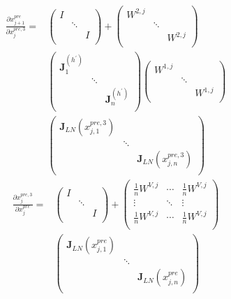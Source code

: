 \documentclass{article}
\begin{document}
\begin{align}
\frac{\partial x_{j+1}^{pre}}{\partial x_j^{pre,3}}=&\left(
  \begin{array}{ccc}
    I &  &  \\
     & \ddots &  \\
     &  &  I\\
  \end{array}
\right)+
\left(
  \begin{array}{ccc}
    W^{2,j} &  &  \\
     & \ddots &  \\
     &  & W^{2,j} \\
  \end{array}
\right)\nonumber\\
&
\left(
  \begin{array}{ccc}
    \mathbf{J}^{\left(h^{\prime}\right)}_1 &  &  \\
     & \ddots &  \\
     &  & \mathbf{J}^{\left(h^{\prime}\right)}_n \\
  \end{array}
\right)
\left(
  \begin{array}{ccc}
    W^{1,j} &  &  \\
     & \ddots &  \\
     &  & W^{1,j} \\
  \end{array}
\right)\nonumber\\
&
\left(
  \begin{array}{ccc}
    \mathbf{J}_{LN}(x^{pre,3}_{j,1}) &  &  \\
     & \ddots &  \\
     &  & \mathbf{J}_{LN}(x^{pre,3}_{j,n}) \\
  \end{array}
\right)
\end{align}
\begin{align}
\frac{\partial x_{j}^{pre,3}}{\partial x_j^{pre}}=&\left(
  \begin{array}{ccc}
    I &  &  \\
     & \ddots &  \\
     &  &  I\\
  \end{array}
\right)+
\left(
  \begin{array}{ccc}
    \frac{1}{n}W^{V,j} & \cdots & \frac{1}{n}W^{V,j} \\
    \vdots & \ddots & \vdots \\
    \frac{1}{n}W^{V,j} & \cdots & \frac{1}{n}W^{V,j} \\
  \end{array}
\right)\nonumber\\
&
\left(
  \begin{array}{ccc}
    \mathbf{J}_{LN}(x_{j,1}^{pre}) &  &  \\
     & \ddots &  \\
     &  & \mathbf{J}_{LN}(x_{j,n}^{pre}) \\
  \end{array}
\right)
\end{align}
\end{document}
